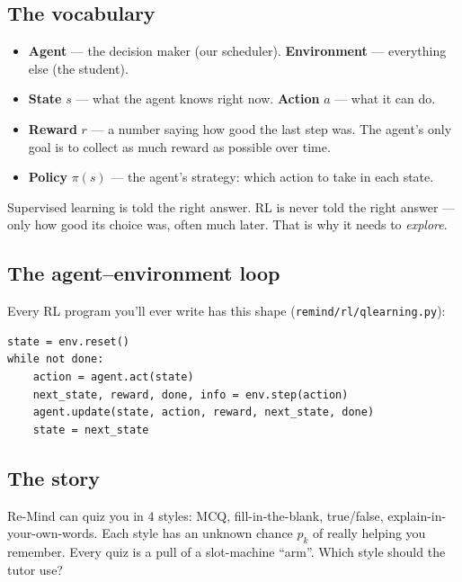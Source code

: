 
\subsection{The vocabulary}
\begin{itemize}
  \item \textbf{Agent} --- the decision maker (our scheduler). \textbf{Environment} --- everything else (the student).
  \item \textbf{State} $s$ --- what the agent knows right now. \textbf{Action} $a$ --- what it can do.
  \item \textbf{Reward} $r$ --- a number saying how good the last step was. The agent's only goal is to collect as
        much reward as possible over time.
  \item \textbf{Policy} $\pi(s)$ --- the agent's strategy: which action to take in each state.
\end{itemize}
Supervised learning is told the right answer. RL is never told the right answer --- only how good its choice was,
often much later. That is why it needs to \emph{explore}.

\subsection{The agent--environment loop}
Every RL program you'll ever write has this shape (\texttt{remind/rl/qlearning.py}):
\begin{lstlisting}
state = env.reset()
while not done:
    action = agent.act(state)
    next_state, reward, done, info = env.step(action)
    agent.update(state, action, reward, next_state, done)
    state = next_state
\end{lstlisting}

\subsection{The story}
Re-Mind can quiz you in 4 styles: MCQ, fill-in-the-blank, true/false, explain-in-your-own-words. Each style has an
unknown chance $p_k$ of really helping you remember. Every quiz is a pull of a slot-machine ``arm''. Which style should
the tutor use?

